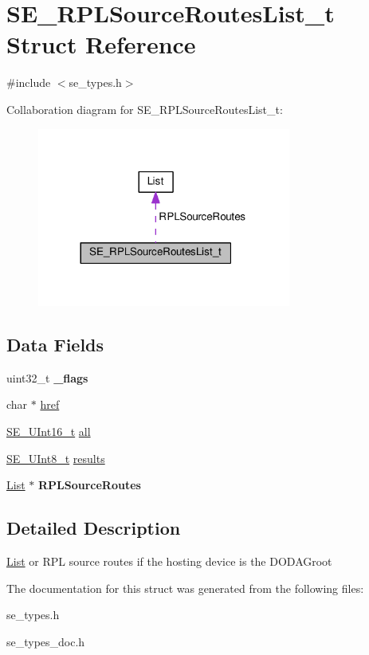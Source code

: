 \hypertarget{structSE__RPLSourceRoutesList__t}{}\section{S\+E\+\_\+\+R\+P\+L\+Source\+Routes\+List\+\_\+t Struct Reference}
\label{structSE__RPLSourceRoutesList__t}


{\ttfamily \#include $<$se\+\_\+types.\+h$>$}



Collaboration diagram for S\+E\+\_\+\+R\+P\+L\+Source\+Routes\+List\+\_\+t\+:\nopagebreak
\begin{figure}[H]
\begin{center}
\leavevmode
\includegraphics[width=236pt]{structSE__RPLSourceRoutesList__t__coll__graph}
\end{center}
\end{figure}
\subsection*{Data Fields}
\begin{DoxyCompactItemize}
\item 
uint32\+\_\+t {\bfseries \+\_\+flags}
\item 
char $\ast$ \hyperlink{group__RPLSourceRoutesList_gaf65b4ffd48968f3035c0e40b241a43f4}{href}
\item 
\hyperlink{group__UInt16_gac68d541f189538bfd30cfaa712d20d29}{S\+E\+\_\+\+U\+Int16\+\_\+t} \hyperlink{group__RPLSourceRoutesList_ga04c0efe18f093f5ff2a5e67a613c54f7}{all}
\item 
\hyperlink{group__UInt8_gaf7c365a1acfe204e3a67c16ed44572f5}{S\+E\+\_\+\+U\+Int8\+\_\+t} \hyperlink{group__RPLSourceRoutesList_ga1c13d6ce2b9941d34c0562011bae9012}{results}
\item 
\hyperlink{structList}{List} $\ast$ {\bfseries R\+P\+L\+Source\+Routes}
\end{DoxyCompactItemize}


\subsection{Detailed Description}
\hyperlink{structList}{List} or R\+PL source routes if the hosting device is the D\+O\+D\+A\+Groot 

The documentation for this struct was generated from the following files\+:\begin{DoxyCompactItemize}
\item 
se\+\_\+types.\+h\item 
se\+\_\+types\+\_\+doc.\+h\end{DoxyCompactItemize}
